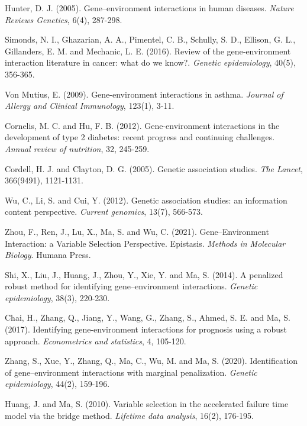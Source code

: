 \documentclass[12pt]{article}
\begin{document}
\begin{thebibliography}{99}
	
Hunter, D. J. (2005). Gene–environment interactions in human diseases. \emph{Nature Reviews Genetics}, 6(4), 287-298.

Simonds, N. I., Ghazarian, A. A., Pimentel, C. B., Schully, S. D., Ellison, G. L., Gillanders, E. M. and Mechanic, L. E. (2016). Review of the gene‐environment interaction literature in cancer: what do we know?. \emph{Genetic epidemiology}, 40(5), 356-365.

Von Mutius, E. (2009). Gene-environment interactions in asthma. \emph{Journal of Allergy and Clinical Immunology}, 123(1), 3-11.

Cornelis, M. C. and Hu, F. B. (2012). Gene-environment interactions in the development of type 2 diabetes: recent progress and continuing challenges. \emph{Annual review of nutrition}, 32, 245-259.

Cordell, H. J. and Clayton, D. G. (2005). Genetic association studies. \emph{The Lancet}, 366(9491), 1121-1131.

Wu, C., Li, S. and Cui, Y. (2012). Genetic association studies: an information content perspective. \emph{Current genomics}, 13(7), 566-573.

Zhou, F., Ren, J., Lu, X., Ma, S. and Wu, C.  (2021). Gene–Environment Interaction: a Variable Selection Perspective. Epistasis. \emph{Methods in Molecular Biology}. Humana Press.

Shi, X., Liu, J., Huang, J., Zhou, Y., Xie, Y. and Ma, S. (2014). A penalized robust method for identifying gene–environment interactions. \emph{Genetic epidemiology}, 38(3), 220-230.

Chai, H., Zhang, Q., Jiang, Y., Wang, G., Zhang, S., Ahmed, S. E. and Ma, S. (2017). Identifying gene-environment interactions for prognosis using a robust approach. \emph{Econometrics and statistics}, 4, 105-120.

Zhang, S., Xue, Y., Zhang, Q., Ma, C., Wu, M. and Ma, S. (2020). Identification of gene–environment interactions with marginal penalization. \emph{Genetic epidemiology}, 44(2), 159-196.

Huang, J. and Ma, S. (2010). Variable selection in the accelerated failure time model via the bridge method. \emph{Lifetime data analysis}, 16(2), 176-195.


\end{thebibliography}
\end{document}
